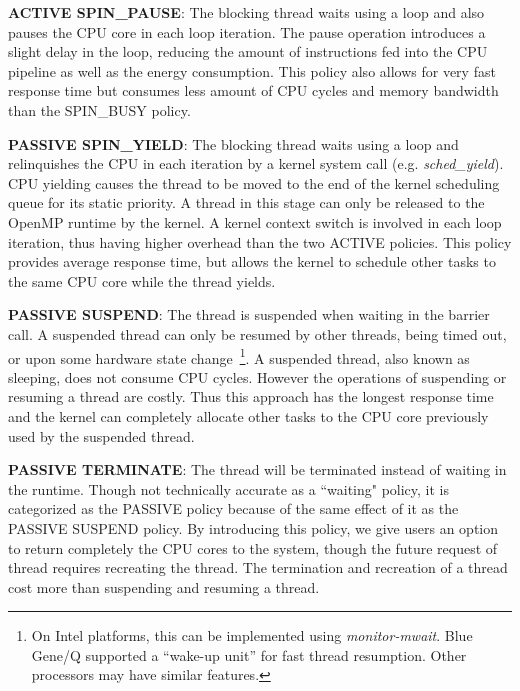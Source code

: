 	{\bf ACTIVE SPIN\_PAUSE}: The blocking thread waits using a loop and also pauses the CPU core in 
	each loop iteration. The pause operation introduces a slight delay in the loop, reducing the amount 
	of instructions fed into the CPU pipeline as well as the energy consumption. This policy also allows 
	for very fast response time but consumes less amount of CPU cycles 
	and memory bandwidth than the {\sf SPIN\_BUSY} policy.

	{\bf PASSIVE SPIN\_YIELD}:  The blocking thread waits using a loop and 
	relinquishes the CPU in each iteration by a kernel system call (e.g. {\em sched\_yield}). CPU yielding causes
	the thread to be moved to the end of the kernel scheduling queue for its static priority. A thread in this 
		stage can only be released to the OpenMP runtime by the kernel. A kernel context switch is involved
		in each loop iteration, thus having higher overhead than the two {\sf ACTIVE} policies. 
		This policy provides average response time, but allows the kernel to schedule other tasks to the same
		CPU core while the thread yields. 

	{\bf PASSIVE SUSPEND}: The thread is suspended when waiting in the barrier call. A suspended thread can only
	be resumed by other threads, being timed out, or upon some hardware state change~\footnote{
                    On Intel platforms, this can be implemented using {\em monitor-mwait}.
                    Blue Gene/Q supported a ``wake-up unit'' for fast thread resumption.
                     Other processors may have similar features.}. A suspended thread, also known as sleeping,  
		     does not consume CPU cycles. 
		     However the operations of suspending or resuming a thread are costly. 
		     Thus this approach has the longest response time and 
		     the kernel can completely allocate other tasks to the CPU 
		     core previously used by the suspended thread. %

       {\bf PASSIVE TERMINATE}: The thread will be terminated instead of waiting in the runtime. Though not technically accurate as
       a ``waiting" policy, it is categorized as the {\sf PASSIVE} policy because of the same effect of it as the {\sf PASSIVE SUSPEND} policy. 
       By introducing this policy, 
       we give users an option to return completely the CPU cores to the system, though the future request of thread requires 
       recreating the thread. The termination and recreation of a thread cost more than suspending and resuming a thread.  

